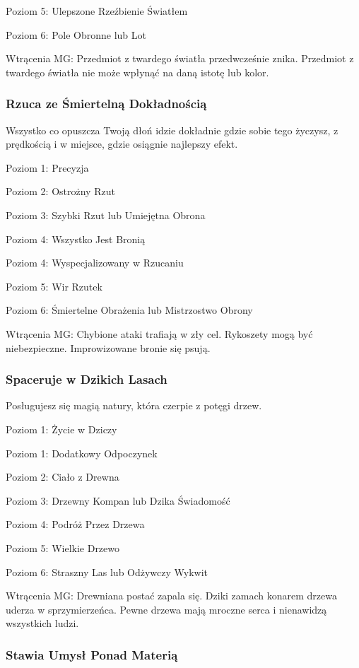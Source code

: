 Poziom 5: Ulepszone Rzeźbienie Światłem

Poziom 6: Pole Obronne lub Lot

Wtrącenia MG: Przedmiot z twardego światła przedwcześnie znika. Przedmiot z twardego światła nie może wpłynąć na daną istotę lub kolor.

\subsubsection{Rzuca ze Śmiertelną Dokładnością}

Wszystko co opuszcza Twoją dłoń idzie dokładnie gdzie sobie tego życzysz, z prędkością i w miejsce, gdzie osiągnie najlepszy efekt.

Poziom 1: Precyzja

Poziom 2: Ostrożny Rzut

Poziom 3: Szybki Rzut lub Umiejętna Obrona

Poziom 4: Wszystko Jest Bronią

Poziom 4: Wyspecjalizowany w Rzucaniu

Poziom 5: Wir Rzutek

Poziom 6: Śmiertelne Obrażenia lub Mistrzostwo Obrony

Wtrącenia MG: Chybione ataki trafiają w zły cel. Rykoszety mogą być niebezpieczne. Improwizowane bronie się psują. 

\subsubsection{Spaceruje w Dzikich Lasach}

Posługujesz się magią natury, która czerpie z potęgi drzew. 

Poziom 1: Życie w Dziczy

Poziom 1: Dodatkowy Odpoczynek

Poziom 2: Ciało z Drewna

Poziom 3: Drzewny Kompan lub Dzika Świadomość

Poziom 4: Podróż Przez Drzewa

Poziom 5: Wielkie Drzewo

Poziom 6: Straszny Las lub Odżywczy Wykwit

Wtrącenia MG: Drewniana postać zapala się. Dziki zamach konarem drzewa uderza w sprzymierzeńca. Pewne drzewa mają mroczne serca i nienawidzą wszystkich ludzi.

\subsubsection{Stawia Umysł Ponad Materią}

